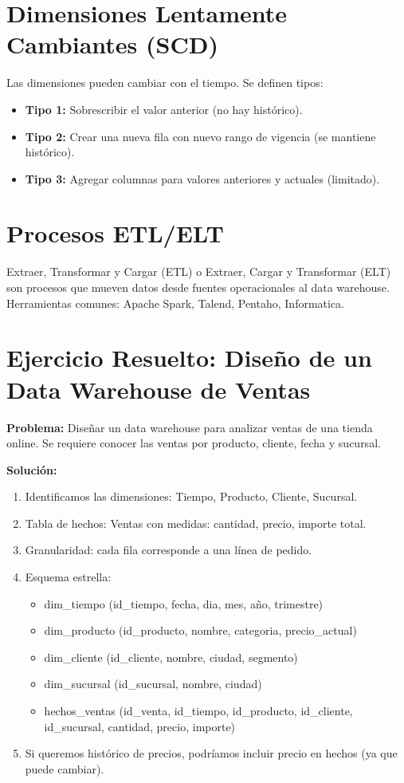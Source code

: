 \documentclass[12pt,a4paper,openany,oneside]{book}
\begin{document}
\section{Dimensiones Lentamente Cambiantes (SCD)}
Las dimensiones pueden cambiar con el tiempo. Se definen tipos:
\begin{itemize}
    \item \textbf{Tipo 1:} Sobrescribir el valor anterior (no hay histórico).
    \item \textbf{Tipo 2:} Crear una nueva fila con nuevo rango de vigencia (se mantiene histórico).
    \item \textbf{Tipo 3:} Agregar columnas para valores anteriores y actuales (limitado).
\end{itemize}

\section{Procesos ETL/ELT}
Extraer, Transformar y Cargar (ETL) o Extraer, Cargar y Transformar (ELT) son procesos que mueven datos desde fuentes operacionales al data warehouse. Herramientas comunes: Apache Spark, Talend, Pentaho, Informatica.

\section{Ejercicio Resuelto: Diseño de un Data Warehouse de Ventas}
\textbf{Problema:} Diseñar un data warehouse para analizar ventas de una tienda online. Se requiere conocer las ventas por producto, cliente, fecha y sucursal.

\textbf{Solución:}
\begin{enumerate}
    \item Identificamos las dimensiones: Tiempo, Producto, Cliente, Sucursal.
    \item Tabla de hechos: Ventas con medidas: cantidad, precio, importe total.
    \item Granularidad: cada fila corresponde a una línea de pedido.
    \item Esquema estrella:
        \begin{itemize}
            \item dim\_tiempo (id\_tiempo, fecha, dia, mes, año, trimestre)
            \item dim\_producto (id\_producto, nombre, categoria, precio\_actual)
            \item dim\_cliente (id\_cliente, nombre, ciudad, segmento)
            \item dim\_sucursal (id\_sucursal, nombre, ciudad)
            \item hechos\_ventas (id\_venta, id\_tiempo, id\_producto, id\_cliente, id\_sucursal, cantidad, precio, importe)
        \end{itemize}
    \item Si queremos histórico de precios, podríamos incluir precio en hechos (ya que puede cambiar).
\end{enumerate}
\end{document}
